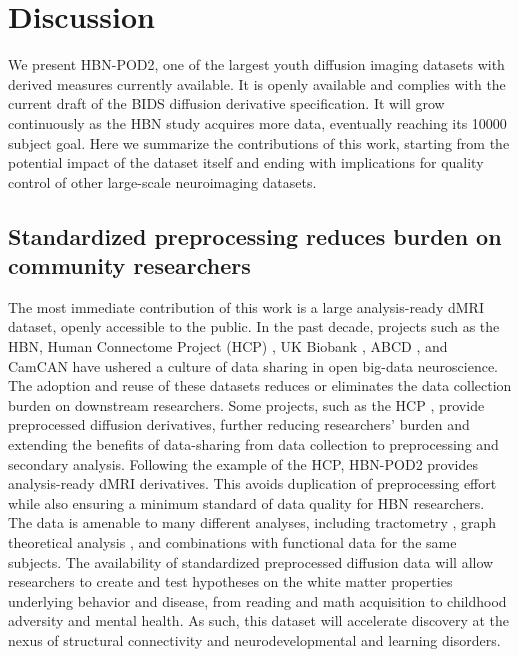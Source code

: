 \documentclass[fleqn,10pt]{wlscirep}
\begin{document}
\section*{Discussion}

We present HBN-POD2, one of the largest youth diffusion imaging datasets with
derived measures currently available. It is openly available and complies with
the current draft of the BIDS diffusion derivative specification. It will grow
continuously as the HBN study acquires more data, eventually reaching its
\num{10000} subject goal. Here we summarize the contributions of this work,
starting from the potential impact of the dataset itself and ending with implications for
quality control of other large-scale neuroimaging datasets.

\subsection*{Standardized preprocessing reduces burden on community researchers}

The most immediate contribution of this work is a large analysis-ready dMRI
dataset, openly accessible to the public. In the past decade, projects such as
the HBN, Human Connectome Project (HCP) \cite{van-essen2013-oi}, UK Biobank
\cite{miller2016-mq}, ABCD \cite{jernigan2018-my}, and CamCAN
\cite{taylor2017-or,shafto2014-ld} have ushered a culture of data sharing in
open big-data neuroscience. The adoption and reuse of these datasets reduces or
eliminates the data collection burden on downstream researchers.  Some projects,
such as the HCP \cite{glasser2013-lo}, provide preprocessed diffusion
derivatives, further reducing researchers' burden and extending the benefits of
data-sharing from data collection to preprocessing and secondary analysis.
Following the example of the HCP, HBN-POD2 provides analysis-ready dMRI
derivatives. This avoids duplication of preprocessing effort while also ensuring
a minimum standard of data quality for HBN researchers. The data is amenable to
many different analyses, including tractometry \cite{yeatman2012-rc}, graph
theoretical analysis \cite{yeh2020-nu}, and combinations with functional data
for the same subjects.  The availability of standardized preprocessed diffusion
data will allow researchers to create and test hypotheses on the white matter
properties underlying behavior and disease, from reading and math acquisition to
childhood adversity and mental health. As such, this dataset will accelerate
discovery at the nexus of structural connectivity and neurodevelopmental and
learning disorders.
\end{document}
